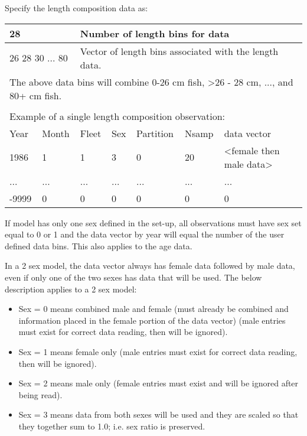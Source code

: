 Specify the length composition data as:
\begin{center}
	\begin{tabular}{p{1.5cm} p{1.5cm} p{1.5cm} p{1.5cm} p{1.5cm} p{1.5cm} p{5cm}}
		\hline
		\multicolumn{2}{l}{28} & \multicolumn{5}{l}{Number of length bins for data}\Tstrut\Bstrut\\
		\hline
		\multicolumn{2}{l}{26 28 30 ... 80} &  \multicolumn{5}{l}{Vector of length bins associated with the length data. }\Tstrut\Bstrut\\
		\hline
		\multicolumn{7}{l}{The above data bins will combine 0-26 cm fish, >26 - 28 cm, ..., and 80+ cm fish.} \\
		\\
		\multicolumn{7}{l}{Example of a single length composition observation:} \\
		\hline
		Year & Month & Fleet & Sex & Partition & Nsamp & data vector\Tstrut\Bstrut\\
		\hline
		1986 & 1 & 1 & 3 & 0 & 20 & <female then male data> \Tstrut\\
		... & ...& ... & ... & ...& ... & ... \\
		-9999 & 0 & 0 & 0 & 0 & 0 & 0 \Bstrut\\
		\hline	
	\end{tabular}
\end{center}

If model has only one sex defined in the set-up, all observations must have sex set equal to 0 or 1 and the data vector by year will equal the number of the user defined data bins. This also applies to the age data. 

In a 2 sex model, the data vector always has female data followed by male data, even if only one of the two sexes has data that will be used. The below description applies to a 2 sex model:
	\begin{itemize}
		\item Sex = 0 means combined male and female (must already be combined and information placed in the female portion of the data vector) (male entries must exist for correct data reading, then will be ignored).
		\item Sex = 1 means female only (male entries must exist for correct data reading, then will be ignored).
		\item Sex = 2 means male only (female entries must exist and will be ignored after being read).
		\item Sex = 3 means data from both sexes will be used and they are scaled so that they together sum to 1.0; i.e. sex ratio is preserved.
	\end{itemize}

